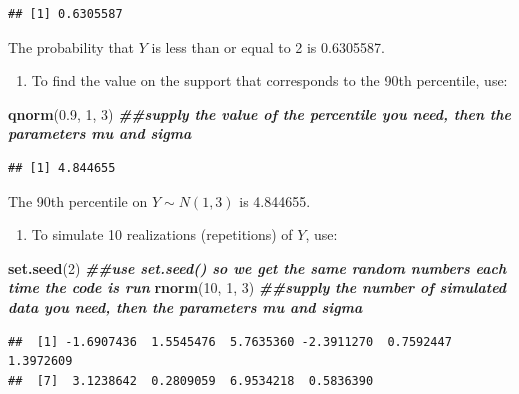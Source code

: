 \documentclass[
]{book}
\newenvironment{Shaded}{\begin{snugshade}}{\end{snugshade}}
\newcommand{\DecValTok}[1]{\textcolor[rgb]{0.00,0.00,0.81}{#1}}
\newcommand{\DocumentationTok}[1]{\textcolor[rgb]{0.56,0.35,0.01}{\textbf{\textit{#1}}}}
\newcommand{\FloatTok}[1]{\textcolor[rgb]{0.00,0.00,0.81}{#1}}
\newcommand{\FunctionTok}[1]{\textcolor[rgb]{0.13,0.29,0.53}{\textbf{#1}}}
\newcommand{\NormalTok}[1]{#1}
\providecommand{\tightlist}{%
  \setlength{\itemsep}{0pt}\setlength{\parskip}{0pt}}
\begin{document}
\begin{verbatim}
## [1] 0.6305587
\end{verbatim}

The probability that \(Y\) is less than or equal to 2 is 0.6305587.

\begin{enumerate}
\def\labelenumi{\arabic{enumi}.}
\setcounter{enumi}{2}
\tightlist
\item
  To find the value on the support that corresponds to the 90th percentile, use:
\end{enumerate}

\begin{Shaded}
\begin{Highlighting}[]
\FunctionTok{qnorm}\NormalTok{(}\FloatTok{0.9}\NormalTok{, }\DecValTok{1}\NormalTok{, }\DecValTok{3}\NormalTok{) }\DocumentationTok{\#\#supply the value of the percentile you need, then the parameters mu and sigma}
\end{Highlighting}
\end{Shaded}

\begin{verbatim}
## [1] 4.844655
\end{verbatim}

The 90th percentile on \(Y \sim N(1,3)\) is 4.844655.

\begin{enumerate}
\def\labelenumi{\arabic{enumi}.}
\setcounter{enumi}{3}
\tightlist
\item
  To simulate 10 realizations (repetitions) of \(Y\), use:
\end{enumerate}

\begin{Shaded}
\begin{Highlighting}[]
\FunctionTok{set.seed}\NormalTok{(}\DecValTok{2}\NormalTok{) }\DocumentationTok{\#\#use set.seed() so we get the same random numbers each time the code is run}
\FunctionTok{rnorm}\NormalTok{(}\DecValTok{10}\NormalTok{, }\DecValTok{1}\NormalTok{, }\DecValTok{3}\NormalTok{) }\DocumentationTok{\#\#supply the number of simulated data you need, then the parameters mu and sigma}
\end{Highlighting}
\end{Shaded}

\begin{verbatim}
##  [1] -1.6907436  1.5545476  5.7635360 -2.3911270  0.7592447  1.3972609
##  [7]  3.1238642  0.2809059  6.9534218  0.5836390
\end{verbatim}
\end{document}
